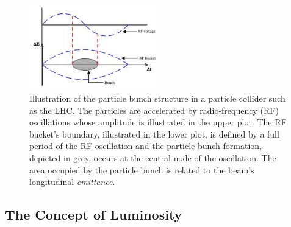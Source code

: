 \begin{figure}[!htb]
    \begin{center}
        \includegraphics[width=0.5\textwidth]{figures/chapter2/lhc_bunch}
        \caption{
            Illustration of the particle bunch structure in a particle collider such as the LHC.
            The particles are accelerated by radio-frequency (RF) oscillations whose
            amplitude is illustrated in the upper plot.
            The RF bucket's boundary, illustrated in the lower plot, is defined by a full period of the RF oscillation
            and the particle bunch formation, depicted in grey, occurs at the central node of the oscillation.
            The area occupied by the particle bunch is related to the beam's longitudinal
            \textit{emittance}.
        }
        \label{fig:lhc_bunch}
    \end{center}
\end{figure}

\subsection{The Concept of Luminosity}
\label{sec:lhc_luminosity}

